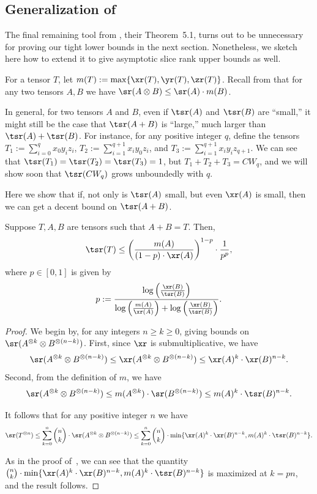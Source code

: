 \documentclass{toc}
\begin{document}
\subsection{Generalization of \cite[Theorem~5.1]{aw}}
The final remaining tool from \cite{aw}, their Theorem~5.1, turns out to be unnecessary for proving our tight lower bounds in the next section. Nonetheless, we sketch here how to extend it to give asymptotic slice rank upper bounds as well.

For a tensor $T$, let $m(T) := \max \{ \xr(T), \yr(T), \zr(T) \}$. Recall from  that for any two tensors $A,B$ we have $\sr(A \otimes B) \leq \sr(A) \cdot m(B)$.

In general, for two tensors $A$ and $B$, even if $\tsr(A)$ and  $\tsr(B)$ are ``small,'' it might still be the case that $\tsr(A+B)$ is ``large,'' much larger than $\tsr(A) + \tsr(B)$. For instance, for any positive integer $q$, define the tensors $T_1 := \sum_{i=0}^q x_0 y_i z_i$, $T_2 := \sum_{i=1}^{q+1} x_i y_0 z_i$, and $T_3 := \sum_{i=1}^{q+1} x_i y_i z_{q+1}$. We can see that $\tsr(T_1) = \tsr(T_2) = \tsr(T_3) = 1$, but $T_1 + T_2 + T_3 = CW_{q}$, and we will show soon that $\tsr(CW_q)$ grows unboundedly with $q$.

Here we show that if, not only is $\tsr(A)$ small, but even $\xr(A)$ is small, then we can get a decent bound on  $\tsr(A+B)$.

\begin{theorem} \label{removeanxtool}
Suppose $T,A,B$ are tensors such that $A + B = T$. Then,
$$\tsr(T) \leq \left( \frac{m(A)}{(1-p) \cdot \xr(A)} \right)^{1-p} \cdot \frac{1}{p^p},$$
where $p \in [0,1]$ is given by
$$p := \frac{\log\left( \frac{\xr(B)}{\tsr(B)} \right)}{ \log\left(\frac{m(A)}{\xr(A)}\right) + \log\left(\frac{\xr(B)}{\tsr(B)}\right)}.$$
\end{theorem}

\begin{proof}
We begin by, for any integers $n \geq k \geq 0$, giving bounds on $\sr(A^{\otimes k} \otimes B^{\otimes (n-k)})$. First, since $\xr$ is submultiplicative, we have $$\sr(A^{\otimes k} \otimes B^{\otimes (n-k)}) \leq \xr(A^{\otimes k} \otimes B^{\otimes (n-k)}) \leq \xr(A)^k \cdot \xr(B)^{n-k}.$$
Second, from the definition of $m$, we have $$\sr(A^{\otimes k} \otimes B^{\otimes (n-k)}) \leq m(A^{\otimes k}) \cdot \sr(B^{\otimes (n-k)})  \leq m(A)^k \cdot \tsr(B)^{n-k}.$$

It follows that for any positive integer $n$ we have
$$\sr(T^{\otimes n}) \leq \sum_{k=0}^n \binom{n}{k} \cdot \sr(A^{\otimes k} \otimes B^{\otimes (n-k)}) \leq \sum_{k=0}^n \binom{n}{k} \cdot \min \{ \xr(A)^k \cdot \xr(B)^{n-k}, m(A)^k \cdot \tsr(B)^{n-k} \}.$$

As in the proof of~\cite[Theorem~5.1]{aw}, we can see that the quantity $\binom{n}{k} \cdot \min \{ \xr(A)^k \cdot \xr(B)^{n-k}, m(A)^k \cdot \tsr(B)^{n-k} \}$ is maximized at $k = pn$, and the result follows.
\end{proof}
\end{document}
